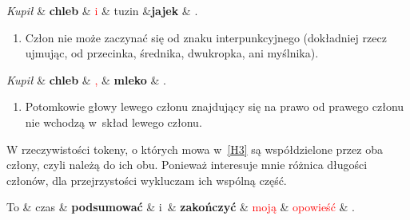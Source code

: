 \begin{exe}
\ex  \label{H1-przykład}
\begin{dependency}[baseline=-\the\dimexpr\fontdimen22\textfont2\relax]
\begin{deptext}[column sep=1em, row sep=.1ex]
\emph{Kupił} \& \textbf{chleb} \& \textcolor{red}{i} \& tuzin \&\textbf{jajek} \& .  \\ 
\end{deptext}
\end{dependency}
\end{exe}

\begin{enumerate}
\item[\namedlabel{H2}{(H2)}]
Człon nie może zaczynać się od znaku interpunkcyjnego (dokładniej rzecz ujmując, od przecinka, średnika, dwukropka, ani myślnika).
\end{enumerate}

\begin{exe}
\ex  \label{H2-przykład}
\begin{dependency}[baseline=-\the\dimexpr\fontdimen22\textfont2\relax]
\begin{deptext}[column sep=1em]
\emph{Kupił} \& \textbf{chleb} \& \textcolor{red}{,} \& \textbf{mleko} \& .  \\ 
\end{deptext}
\end{dependency}
\end{exe}

\begin{enumerate}
\item[\namedlabel{H3}{(H3)}]
Potomkowie głowy lewego członu znajdujący się na prawo od prawego członu nie wchodzą w~skład lewego członu.
\end{enumerate}

W rzeczywistości tokeny, o których mowa w~\ref{H3} są współdzielone przez oba człony, czyli należą do ich obu. Ponieważ interesuje mnie różnica długości członów, dla przejrzystości wykluczam ich wspólną część.

\begin{exe}
\ex \label{H3-przykład}
\begin{dependency}[baseline=-\the\dimexpr\fontdimen22\textfont2\relax]
\begin{deptext}[column sep=1em]
To \& czas \& \textbf{podsumować} \& i~\& \textbf{zakończyć} \& \textcolor{red}{moją} \& \textcolor{red}{opowieść} \& .  \\ 
\end{deptext}
\end{dependency}
\end{exe}

